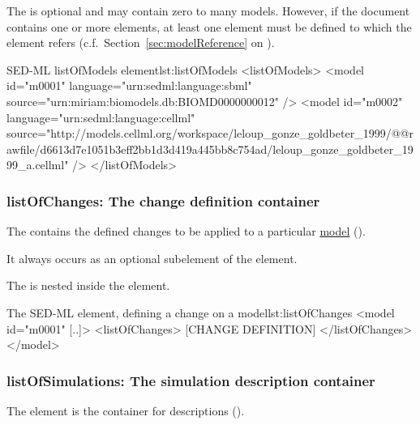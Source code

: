
The  is optional and may contain zero to many models. However, if the \currentLV document contains  one or more  elements, at least one  element must be defined to which the  element refers (c.f.\ Section~\ref{sec:modelReference} on ).

\begin{myXmlLst}{SED-ML listOfModels element}{lst:listOfModels}
<listOfModels>
 <model id="m0001" language="urn:sedml:language:sbml" 
  source="urn:miriam:biomodels.db:BIOMD0000000012" />
 <model id="m0002" language="urn:sedml:language:cellml" 
  source="http://models.cellml.org/workspace/leloup_gonze_goldbeter_1999/@@rawfile/d6613d7e1051b3eff2bb1d3d419a445bb8c754ad/leloup_gonze_goldbeter_1999_a.cellml" />
</listOfModels>
\end{myXmlLst}


\subsubsection{listOfChanges: The change definition container}
\label{sec:listOfChanges}
The  contains the defined changes to be applied to a particular \hyperref[class:model]{model} (). 


It always occurs as an optional subelement of the  element. 

The  is nested inside the  element.

\begin{myXmlLst}{The SED-ML  element, defining a change on a model}{lst:listOfChanges}
<model id="m0001" [..]>
 <listOfChanges>
  [CHANGE DEFINITION]
 </listOfChanges>
</model>
\end{myXmlLst}


\subsubsection{listOfSimulations: The simulation description container}
\label{sec:listOfSimulations}
The  element is the container for  descriptions ().

